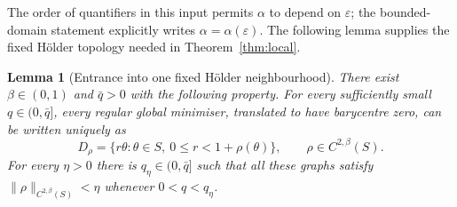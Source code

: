 \documentclass[11pt,a4paper]{article}
\newtheorem{lemma}[theorem]{Lemma}
\theoremstyle{definition}
\theoremstyle{remark}
\begin{document}
The order of quantifiers in this input permits $\alpha$ to depend on
$\varepsilon$; the bounded-domain statement
\cite[Theorem~3.1, p.~1038]{MMR2025} explicitly writes
$\alpha=\alpha(\varepsilon)$.  The following lemma supplies the fixed
H\"older topology needed in Theorem~\ref{thm:local}.

\begin{lemma}[Entrance into one fixed H\"older neighbourhood]
\label{lem:entrance}
There exist $\beta\in(0,1)$ and $\bar q>0$ with the following property.
For every sufficiently small $q\in(0,\bar q]$, every regular global
minimiser, translated to have barycentre zero, can be written uniquely
as
\[
 D_\rho=\{r\theta:\theta\in S,\ 0\leq r<1+\rho(\theta)\},
 \qquad \rho\in C^{2,\beta}(S).
\]
For every $\eta>0$ there is $q_\eta\in(0,\bar q]$ such that all these
graphs satisfy $\|\rho\|_{C^{2,\beta}(S)}<\eta$ whenever
$0<q<q_\eta$.
\end{lemma}
\end{document}
